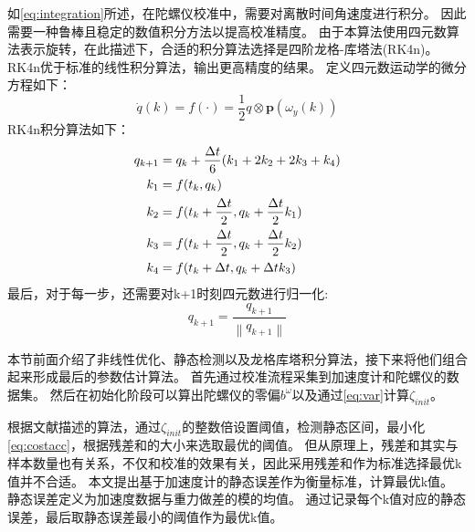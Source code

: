 \documentclass[
  type=master
]{gdutthesis}
\begin{document}
如\autoref{eq:integration}所述，在陀螺仪校准中，需要对离散时间角速度进行积分。
因此需要一种鲁棒且稳定的数值积分方法以提高校准精度。
由于本算法使用四元数算法表示旋转，在此描述下，合适的积分算法选择是四阶龙格-库塔法(RK4n)\cite{andrle2013geometric}。
RK4n优于标准的线性积分算法，输出更高精度的结果。
定义四元数运动学的微分方程如下：
\begin{equation}
	\dot{q}(k)=f(\cdot )=\frac{1}{2} q \otimes \mathbf{p}(\omega_y(k))
\end{equation}
RK4n积分算法如下：
\begin{equation}\label{eq:rk4}
	\begin{aligned}
		q_{k+1} &= q_k + \frac{\Delta t}{6}(k_1 + 2 k_2 + 2 k_3 + k_4)\\
		k_1 &= f(t_k , q_k)\\
		k_2 &= f(t_k + \frac{\Delta t}{2},q_k + \frac{\Delta t}{2} k_1)\\
		k_3 &= f(t_k + \frac{\Delta t}{2},q_k + \frac{\Delta t}{2} k_2)\\
		k_4 &= f(t_k + \Delta t, q_k + \Delta t k_3)\vspace{1ex}
	\end{aligned}
\end{equation}
最后，对于每一步，还需要对k+1时刻四元数进行归一化:
\begin{equation}
	q_{k+1} = \frac{q_{k+1}}{\left\|q_{k+1}\right\|}
\end{equation}

本节前面介绍了非线性优化、静态检测以及龙格库塔积分算法，接下来将他们组合起来形成最后的参数估计算法。
首先通过校准流程采集到加速度计和陀螺仪的数据集。
然后在初始化阶段可以算出陀螺仪的零偏$b^\omega$以及通过\autoref{eq:var}计算$\zeta_{init}$。

根据文献\parencite{tedaldi2014robust}描述的算法，通过$\zeta_{init}$的整数倍设置阈值，检测静态区间，最小化\autoref{eq:costacc}，根据残差和的大小来选取最优的阈值。
但从原理上，残差和其实与样本数量也有关系，不仅和校准的效果有关，因此采用残差和作为标准选择最优k值并不合适。
本文提出基于加速度计的静态误差作为衡量标准，计算最优k值。
静态误差定义为加速度数据与重力做差的模的均值。
通过记录每个k值对应的静态误差，最后取静态误差最小的阈值作为最优k值。
\end{document}
